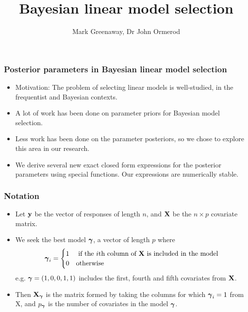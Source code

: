 \documentclass{beamer}
\title{Bayesian linear model selection}
\author{Mark Greenaway, Dr John Ormerod}
\begin{document}
\begin{frame}
	\titlepage
\end{frame}
			
\begin{frame}
	\frametitle{Posterior parameters in Bayesian linear model selection}
	\begin{itemize}
		\item Motivation: The problem of selecting linear models is well-studied, in the frequentist and Bayesian
					contexts.
		\item A lot of work has been done on parameter priors for Bayesian model selection.
		\item Less work has been done on the parameter posteriors, so we chose to explore this area in our
					research.
		\item We derive several new exact closed form expressions for the posterior parameters using special
					functions. Our expressions are numerically stable.
	\end{itemize}

\end{frame}

\begin{frame}
	\frametitle{Notation}
	\begin{itemize}
		\item Let ${\bf y}$ be the vector of responses of length $n$, and ${\bf X}$ be the $n \times p$ covariate matrix.
		\item We seek the best model ${\boldsymbol \gamma}$, a vector of length $p$ where
					\[
						{\boldsymbol \gamma}_i =
						\begin{cases}
							1 & \text{ if the $i$th column of ${\bf X}$ is included in the model} \\
							0 & \text{otherwise}
						\end{cases}
					\]
		e.g. ${\boldsymbol \gamma} = (1, 0, 0, 1, 1)$ includes the first, fourth and fifth covariates from ${\bf X}$.
		\item Then ${\bf X}_{\boldsymbol \gamma}$ is the matrix formed by taking the columns for which ${\boldsymbol \gamma}_i = 1$ from X,
					and $p_{\boldsymbol \gamma}$ is the number of covariates in the model ${\boldsymbol \gamma}$.
	\end{itemize}
\end{frame}
\end{document}
